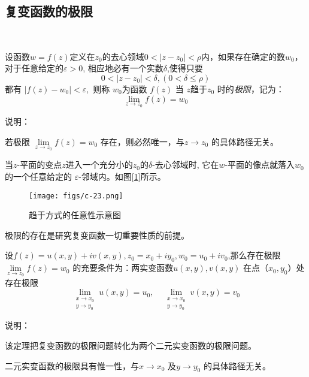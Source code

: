 \subsection{复变函数的极限}~\\

\begin{definition}\label{}\index{}
    设函数$w = f(z)$定义在$z_0$的去心领域$0<\left\vert z - z_0\right\vert < \rho $内，如果存在确定的数$w_0$， 对于任意给定的$\varepsilon >0 $, 相应地必有一个实数$\delta $,使得只要
    \[ 0<\left\vert z - z_0\right\vert < \delta, ( 0< \delta \le \rho )  \]
    都有 $\left\vert f(z) -w_0\right\vert < \varepsilon , $ 则称 $w_0$为函数 $f(z)$ 当 $z $趋于$z_0$ 时的\emph{极限}，记为：
    \[ \lim_{z \to z_0} f(z) = w_0\] 
\end{definition}
说明：\begin{compactitem}
    \item 若极限 $\lim\limits_{z \to z_0} f(z) = w_0$
	存在，则必然唯一，与$z \to z_0$ 的具体路径无关。
    \item 当$z$-平面的变点$z$进入一个充分小的$z_0$的$\delta $-去心邻域时, 它在$w$-平面的像点就落入$w_0$ 的一个任意给定的 $\varepsilon$-邻域内。如图[\ref{fig:qxry}]所示。
    \begin{figure}[htbp]
      \centering
      \texttt{[image: figs/c-23.png]}
      \caption{趋于方式的任意性示意图}
      \label{fig:qxry}
    \end{figure} 
    \item 极限的存在是研究复变函数一切重要性质的前提。
\end{compactitem}

\begin{theorem}\label{} \index{}
    设$f(z) = u(x,y) + i v(x,y), z_0 = x_0 + i y_0, w_0 = u_0 + i v_0$,那么存在极限$ \lim\limits_{z \to z_0} f(z) = w_0 $ 的充要条件为：两实变函数$u(x, y), v(x,y)$ 在点（$x_0, y_0$）处存在极限
    \[ \lim _{\substack{x \rightarrow x_{0} \\ y \rightarrow y_{0}}} u(x, y)=u_{0}, \quad \lim _{\substack{x \rightarrow x_{0} \\ y \rightarrow y_{0}}} v(x, y)=v_{0}\]
\end{theorem}
说明：\begin{compactitem}
    \item 该定理把复变函数的极限问题转化为两个二元实变函数的极限问题。
    \item 二元实变函数的极限具有惟一性，与$x \rightarrow x_{0} $ 及$y \rightarrow y_{0} $ 的具体路径无关。
\end{compactitem}

